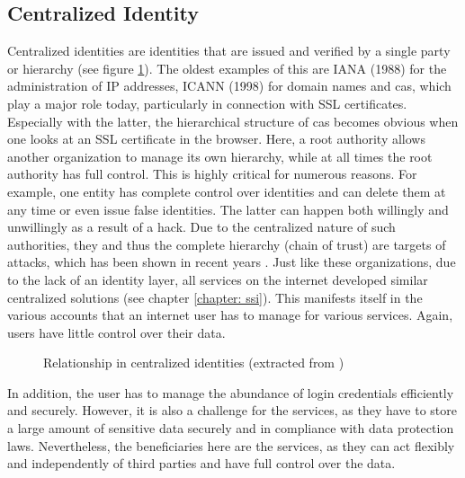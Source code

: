 	    \subsection{Centralized Identity}
	    Centralized identities are identities that are issued and verified by a single party or hierarchy (see figure \ref{figure: centralized}). The oldest examples of this are IANA (1988) for the administration of IP addresses, ICANN (1998) for domain names and \acfp{ca}, which play a major role today, particularly in connection with SSL certificates. Especially with the latter, the hierarchical structure of \acp{ca} becomes obvious when one looks at an SSL certificate in the browser. Here, a root authority allows another organization to manage its own hierarchy, while at all times the root authority has full control. This is highly critical for numerous reasons. For example, one entity has complete control over identities and can delete them at any time or even issue false identities. The latter can happen both willingly and unwillingly as a result of a hack. Due to the centralized nature of such authorities, they and thus the complete hierarchy (chain of trust) are targets of attacks, which has been shown in recent years \cite{borchers_diginotar-ssl-gau_2012}. Just like these organizations, due to the lack of an identity layer, all services on the internet developed similar centralized solutions (see chapter \ref{chapter: ssi}). This manifests itself in the various accounts that an internet user has to manage for various services. Again, users have little control over their data. \cite{allen_path_2016}
	    
	    \begin{figure}[ht]
    	    \centering
    	    \makebox[\textwidth]{}
            \caption[Relationship in centralized identities]{Relationship in centralized identities (extracted from \cite[p. 7]{preukschat_self-sovereign_2021})}
            \label{figure: centralized}
        \end{figure}
	    
	    In addition, the user has to manage the abundance of login credentials efficiently and securely. However, it is also a challenge for the services, as they have to store a large amount of sensitive data securely and in compliance with data protection laws. Nevertheless, the beneficiaries here are the services, as they can act flexibly and independently of third parties and have full control over the data. \cite[p. 6]{ehrlich_self-sovereign_2021}
	    

